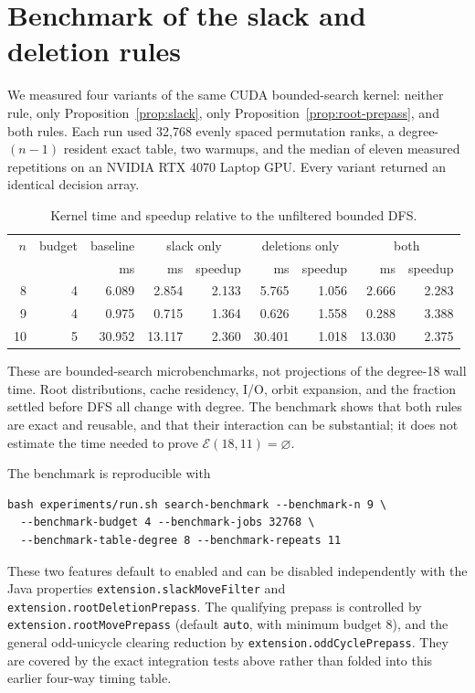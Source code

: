 \documentclass[11pt]{article}
\theoremstyle{definition}
\theoremstyle{remark}
\newcommand{\E}{\mathcal E}
\newcommand{\code}[1]{\texttt{#1}}
\begin{document}
\section{Benchmark of the slack and deletion rules}
\label{sec:benchmark}

We measured four variants of the same CUDA bounded-search kernel: neither
rule, only Proposition~\ref{prop:slack}, only
Proposition~\ref{prop:root-prepass}, and both rules.  Each run used 32,768
evenly spaced permutation ranks, a degree-$(n-1)$ resident exact table, two
warmups, and the median of eleven measured repetitions on an NVIDIA RTX 4070
Laptop GPU.  Every variant returned an identical decision array.

\begin{table}[ht]
\centering
\caption{Kernel time and speedup relative to the unfiltered bounded DFS.}
\label{tab:benchmark}
\begin{tabular}{@{}rrrrrrrrr@{}}
\toprule
$n$ & budget & baseline & \multicolumn{2}{c}{slack only}
 & \multicolumn{2}{c}{deletions only} & \multicolumn{2}{c}{both}\\
\cmidrule(lr){4-5}\cmidrule(lr){6-7}\cmidrule(l){8-9}
 & & ms & ms & speedup & ms & speedup & ms & speedup\\
\midrule
8  & 4 &  6.089 &  2.854 & 2.133 &  5.765 & 1.056 &  2.666 & 2.283\\
9  & 4 &  0.975 &  0.715 & 1.364 &  0.626 & 1.558 &  0.288 & 3.388\\
10 & 5 & 30.952 & 13.117 & 2.360 & 30.401 & 1.018 & 13.030 & 2.375\\
\bottomrule
\end{tabular}
\end{table}

These are bounded-search microbenchmarks, not projections of the degree-18
wall time.  Root distributions, cache residency, I/O, orbit expansion, and
the fraction settled before DFS all change with degree.  The benchmark shows
that both rules are exact and reusable, and that their interaction can be
substantial; it does not estimate the time needed to prove
$\E(18,11)=\varnothing$.

The benchmark is reproducible with
\begin{verbatim}
bash experiments/run.sh search-benchmark --benchmark-n 9 \
  --benchmark-budget 4 --benchmark-jobs 32768 \
  --benchmark-table-degree 8 --benchmark-repeats 11
\end{verbatim}
These two features default to enabled and can be disabled independently with
the Java properties \code{extension.slackMoveFilter} and
\code{extension.rootDeletionPrepass}.  The qualifying prepass is controlled by
\code{extension.rootMovePrepass} (default \code{auto}, with minimum budget 8),
and the general odd-unicycle clearing reduction by
\code{extension.oddCyclePrepass}.  They are covered by the exact integration
tests above rather than folded into this earlier four-way timing table.
\end{document}
